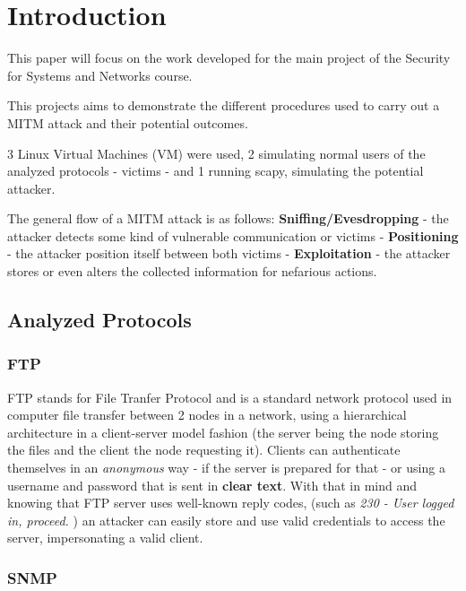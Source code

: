 \section{Introduction}
\label{sec:Intro}
This paper will focus on the work developed for the main project of the 
Security for Systems and Networks course.

This projects aims to demonstrate the different procedures used to carry out a 
MITM attack and their potential outcomes.

3 Linux Virtual Machines (VM) were used, 2 simulating normal users of the 
analyzed protocols - victims - and 1 running scapy, simulating the potential 
attacker.

The general flow of a MITM attack is as follows: \textbf{Sniffing/Evesdropping}
- the attacker detects some kind of vulnerable communication or victims - 
\textbf{Positioning} - the attacker position itself between both victims -
\textbf{Exploitation} - the attacker stores or even alters the collected 
information for nefarious actions.

\subsection{Analyzed Protocols}

\subsubsection{FTP}

FTP stands for File Tranfer Protocol and is a standard network protocol used in computer file transfer between 2 nodes in a network, using a hierarchical architecture in a client-server model fashion (the server being the node storing the files and the client the node requesting it). 
Clients can authenticate themselves in an \textit{anonymous} way - if the server is prepared for that - or using a username and password that is sent in \textbf{clear text}. 
With that in mind and knowing that FTP server uses well-known reply codes, (such as \textit{ 230 - User logged in, proceed.} ) an attacker can easily store and use valid credentials to access the server, impersonating a valid client.  

\subsubsection{SNMP}

